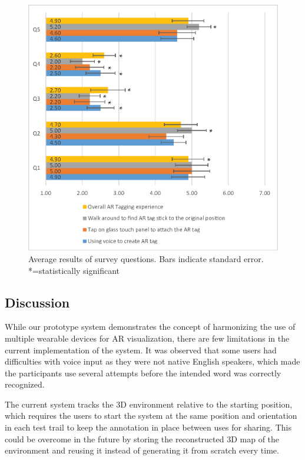 \begin{figure}[ht]
  \centering
  \includegraphics[width=\linewidth]{images/mgia15/user_study_results2.eps}
  \caption{Average results of survey questions. Bars indicate standard error. *=statistically significant}
	\label{survey_results}
\end{figure}


\subsection{Discussion}

While our prototype  system demonstrates the concept of harmonizing the use of multiple wearable devices for AR visualization, there are few limitations in the current implementation of the system. It was observed that some users had difficulties with voice input as they were not native English speakers, which made the participants use several attempts before the intended word was correctly recognized.  

The current system tracks the 3D environment relative to the starting position, which requires the users to start the system at the same position and orientation in each test trail to keep the annotation in place between uses for sharing. This could be overcome in the future by storing the reconstructed 3D map of the environment and reusing it instead of generating it from scratch every time. 

